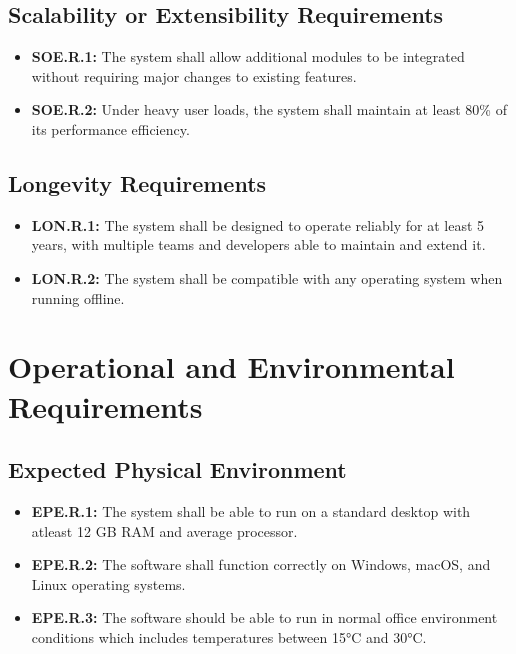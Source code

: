 \documentclass[12pt]{article}
\begin{document}
\subsection{Scalability or Extensibility Requirements}
\begin{itemize}
    \item \textbf{SOE.R.1:} The system shall allow additional modules to be integrated without requiring major changes to existing features.
    \item \textbf{SOE.R.2:}\label{req:soe.r.2} Under heavy user loads, the system shall maintain at least 80\% of its performance efficiency.
\end{itemize}

\subsection{Longevity Requirements}
\begin{itemize}
    \item \textbf{LON.R.1:}\label{req:lon.r.1} The system shall be designed to operate reliably for at least 5 years, with multiple teams and developers able to maintain and extend it.
    \item \textbf{LON.R.2:}\label{req:lon.r.2} The system shall be compatible with any operating system when running offline.
\end{itemize}


\section{Operational and Environmental Requirements}
\subsection{Expected Physical Environment}
\begin{itemize}
    \item \textbf{EPE.R.1:}\label{req:epe.r.1} The system shall be able to run on a standard desktop with atleast 12 GB RAM and average processor.
    \item \textbf{EPE.R.2:}\label{req:epe.r.2} The software shall function correctly on Windows, macOS, and Linux operating systems.
    \item \textbf{EPE.R.3:}\label{req:epe.r.3} The software should be able to run in normal office environment conditions which includes temperatures between 15°C and 30°C. 
\end{itemize}
\end{document}
